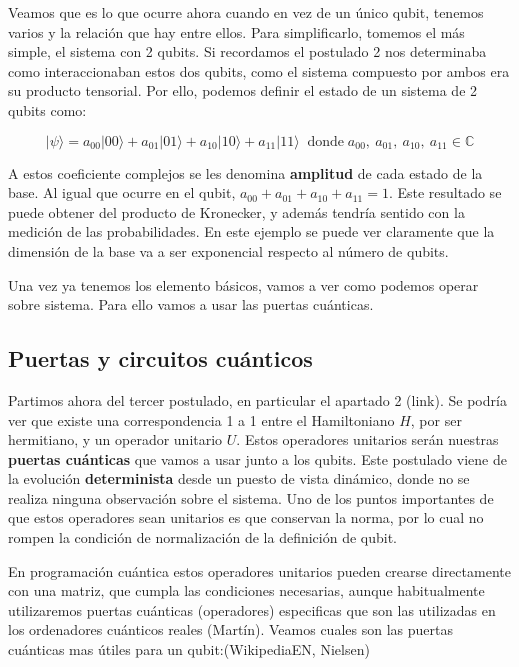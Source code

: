 Veamos que es lo que ocurre ahora cuando en vez de un único qubit, tenemos varios y la relación que hay entre ellos. Para simplificarlo, tomemos el más simple, el sistema con 2 qubits. Si recordamos el postulado 2 nos determinaba como interaccionaban estos dos qubits, como el sistema compuesto por ambos era su producto tensorial. Por ello, podemos definir el estado de un sistema de 2 qubits como:

    \begin{equation*}|\psi\rangle = a_{00}|00\rangle + a_{01}|01\rangle + a_{10}|10\rangle + a_{11}|11\rangle \;\;\text{donde}\; a_{00},\: a_{01}, \:a_{10}, \:a_{11} \in \mathbb{C}
    \end{equation*}

 A estos coeficiente complejos se les denomina \textbf{amplitud} de cada estado de la base. Al igual que ocurre en el qubit, $a_{00}+a_{01}+a_{10}+a_{11}=1$. Este resultado se puede obtener del producto de Kronecker, y además tendría sentido con la medición de las probabilidades. En este ejemplo se puede ver claramente que la dimensión de la base va a ser exponencial respecto al número de qubits.\newline
 
 Una vez ya tenemos los elemento básicos, vamos a ver como podemos operar sobre sistema. Para ello vamos a usar las puertas cuánticas.


\subsection{Puertas y circuitos cuánticos}

 Partimos ahora del tercer postulado, en particular el apartado 2 (link). Se podría ver que existe una correspondencia 1 a 1 entre el Hamiltoniano $H$, por ser hermitiano, y un operador unitario $U$. Estos operadores unitarios serán nuestras \textbf{puertas cuánticas} que vamos a usar junto a los qubits. Este postulado viene de la evolución \textbf{determinista} desde un puesto de vista dinámico, donde no se realiza ninguna observación sobre el sistema. Uno de los puntos importantes de que estos operadores sean unitarios es que conservan la norma, por lo cual no rompen la condición de normalización de la definición de qubit. \newline
 
 En programación cuántica estos operadores unitarios pueden crearse directamente con una matriz, que cumpla las condiciones necesarias, aunque habitualmente utilizaremos puertas cuánticas (operadores) especificas que son las utilizadas en los ordenadores cuánticos reales (Martín). Veamos cuales son las puertas cuánticas mas útiles para un qubit:(WikipediaEN, Nielsen)


